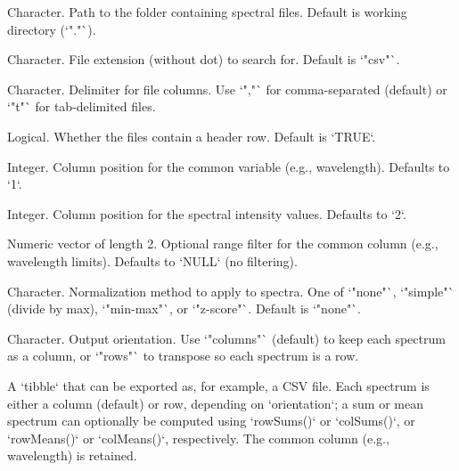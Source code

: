 \documentclass[a4paper]{book}
\begin{document}
%
\begin{Arguments}
\begin{ldescription}
\item[\code{folder}] Character. Path to the folder containing spectral files. Default is working directory (`"."`).

\item[\code{file\_type}] Character. File extension (without dot) to search for. Default is `"csv"`.

\item[\code{sep}] Character. Delimiter for file columns. Use `","` for comma-separated (default) or `"\bsl{}t"` for tab-delimited files.

\item[\code{header}] Logical. Whether the files contain a header row. Default is `TRUE`.

\item[\code{common\_col\_pos}] Integer. Column position for the common variable (e.g., wavelength). Defaults to `1`.

\item[\code{data\_col\_pos}] Integer. Column position for the spectral intensity values. Defaults to `2`.

\item[\code{range}] Numeric vector of length 2. Optional range filter for the common column (e.g., wavelength limits). Defaults to `NULL` (no filtering).

\item[\code{normalization}] Character. Normalization method to apply to spectra. One of `"none"`, `"simple"` (divide by max), `"min-max"`, or `"z-score"`. Default is `"none"`.

\item[\code{orientation}] Character. Output orientation. Use `"columns"` (default) to keep each spectrum as a column, or `"rows"` to transpose so each spectrum is a row.
\end{ldescription}
\end{Arguments}
%
\begin{Value}
A `tibble` that can be exported as, for example, a CSV file. Each spectrum is either a column (default) or row, depending on `orientation`; a sum or mean spectrum can optionally be computed using `rowSums()` or `colSums()`, or `rowMeans()` or `colMeans()`, respectively. The common column (e.g., wavelength) is retained.
\end{Value}
%
\end{document}
